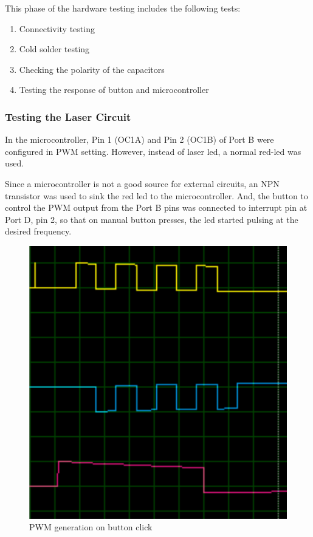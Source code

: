 \documentclass[12pt, a4paper]{article}
\begin{document}
This phase of the hardware testing includes the following tests:
\begin{enumerate}
\item Connectivity testing
\item Cold solder testing
\item Checking the polarity of the capacitors
\item Testing the response of button and microcontroller
\end{enumerate}

\subsubsection{Testing the Laser Circuit}

In the microcontroller, Pin 1 (OC1A) and Pin 2 (OC1B) of Port B were configured in PWM setting. However, instead of laser led, a normal red-led was used. 

Since a microcontroller is not a good source for external circuits, an NPN transistor was used to sink the red led to the microcontroller. And, the button to control the PWM output from the Port B pins was connected to interrupt pin at Port D, pin 2, so that on manual button presses, the led started pulsing at the desired frequency.

\begin{figure}[htp]
\centering
\includegraphics[scale=0.30]{afterpress.png}
\caption{PWM generation on button click}
\label{}
\end{figure}
\end{document}
